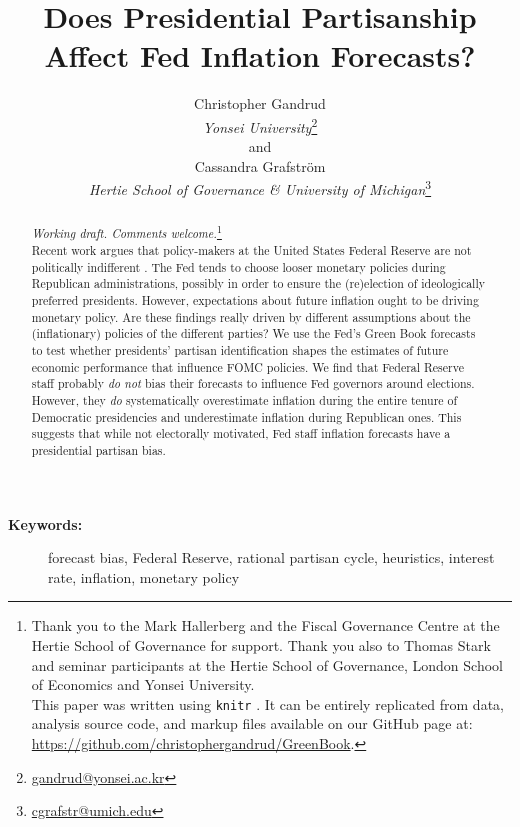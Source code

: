 \documentclass[a4paper]{article}\usepackage{graphicx, color}
\title{Does Presidential Partisanship Affect Fed Inflation Forecasts?}
\author{Christopher Gandrud \\
                {\emph{Yonsei University}}\footnote{\href{mailto:gandrud@yonsei.ac.kr}{gandrud@yonsei.ac.kr}} \\
                and \\
            Cassandra Grafstr\"{o}m \\
                {\emph{Hertie School of Governance \& University of Michigan}}\footnote{\href{mailto:cgrafstr@umich.edu}{cgrafstr@umich.edu}}}
\begin{document}
\maketitle

\begin{abstract}
\noindent\emph{Working draft. Comments welcome.}\footnote{Thank you to the Mark Hallerberg and the Fiscal Governance Centre at the Hertie School of Governance for support. Thank you also to Thomas Stark and seminar participants at the Hertie School of Governance, London School of Economics and Yonsei University. \\
This paper was written using {\tt{knitr}} \citep{knitr2013}. It can be entirely replicated from data, analysis source code, and markup files available on our GitHub page at: {\url{https://github.com/christophergandrud/GreenBook}}.} \\[0.2cm]

Recent work argues that policy-makers at the United States Federal Reserve are not politically indifferent \citep{Clark2012}. The Fed tends to choose looser monetary policies during Republican administrations, possibly in order to ensure the (re)election of ideologically preferred presidents. However, expectations about future inflation ought to be driving monetary policy. Are these findings really driven by different assumptions about the (inflationary) policies of the different parties? We use the Fed's Green Book forecasts to test whether presidents' partisan identification shapes the estimates of future economic performance that influence FOMC policies. We find that Federal Reserve staff probably {\emph{do not}} bias their forecasts to influence Fed governors around elections. However, they {\emph{do}} systematically overestimate inflation during the entire tenure of Democratic presidencies and underestimate inflation during Republican ones. This suggests that while not electorally motivated, Fed staff inflation forecasts have a presidential partisan bias.

\end{abstract}

\begin{description}
  \item [{\textbf{Keywords:}}] forecast bias, Federal Reserve, rational partisan cycle, heuristics, interest rate, inflation, monetary policy
\end{description}

\vspace{0.3cm}
\end{document}
